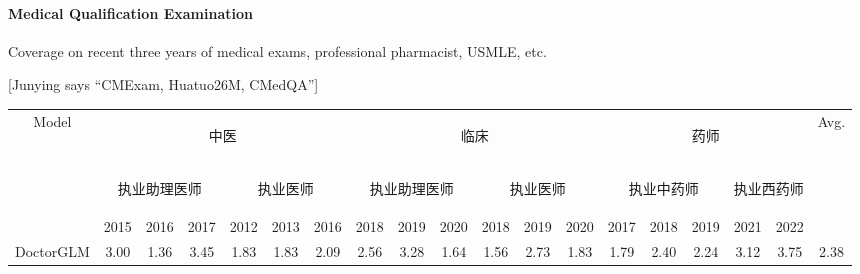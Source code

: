 \documentclass{article} %
\newcommand{\junying}[1]{{ \color{teal} [Junying says ``#1'']}}
\begin{document}
    \paragraph{Medical Qualification Examination}
    Coverage on recent three years of medical exams, professional pharmacist, USMLE, etc.

\junying{CMExam, Huatuo26M, CMedQA}

\begin{table}[]\small
\renewcommand{\arraystretch}{1.3} %
\setlength{\tabcolsep}{3.0pt} %
\begin{tabular}{l|cccccc|cccccc|ccccc|c}
\hline
\multicolumn{1}{c|}{\multirow{3}{*}{Model}} & \multicolumn{6}{c|}{\begin{CJK}{UTF8}{gbsn} {中医}\end{CJK}}  & \multicolumn{6}{c|}{\begin{CJK}{UTF8}{gbsn} {临床}\end{CJK}}  & \multicolumn{5}{c|}{\begin{CJK}{UTF8}{gbsn} {药师}\end{CJK}}& \multirow{3}{*}{Avg.} \\ \cline{2-18}
\multicolumn{1}{c|}{}  & \multicolumn{3}{c|}{\begin{CJK}{UTF8}{gbsn} {\begin{CJK}{UTF8}{gbsn} {执业助理医师}\end{CJK}}\end{CJK}} & \multicolumn{3}{c|}{\begin{CJK}{UTF8}{gbsn} {执业医师}\end{CJK}}& \multicolumn{3}{c|}{\begin{CJK}{UTF8}{gbsn} {执业助理医师}\end{CJK}} & \multicolumn{3}{c|}{\begin{CJK}{UTF8}{gbsn} {执业医师}\end{CJK}}& \multicolumn{3}{c|}{\begin{CJK}{UTF8}{gbsn} {执业中药师}\end{CJK}}  & \multicolumn{2}{c|}{\begin{CJK}{UTF8}{gbsn} {执业西药师}\end{CJK}}&\\
\multicolumn{1}{c|}{}  & 2015 & 2016 & \multicolumn{1}{c|}{2017} & 2012 & 2013 & 2016 & 2018 & 2019 & \multicolumn{1}{c|}{2020} & 2018 & 2019 & 2020 & 2017 & 2018 & \multicolumn{1}{c|}{2019} & 2021 & 2022 &\\ \hline
DoctorGLM  & 3.00  & 1.36  & \multicolumn{1}{c|}{3.45}  & 1.83  & 1.83  & 2.09  & 2.56  & 3.28  & \multicolumn{1}{c|}{1.64}  & 1.56  & 2.73  & 1.83  & 1.79  & 2.40  & \multicolumn{1}{c|}{2.24}  & 3.12  & 3.75  & 2.38 \\ 

\end{tabular}
\end{table}
\end{document}
